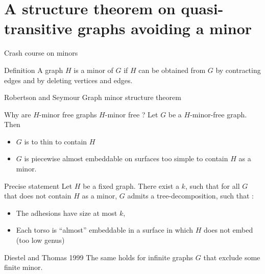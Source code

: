 \documentclass[11pt,dvipsnames,presentation,aspectratio=169]{beamer}
\begin{document}
\section*{A structure theorem on quasi-transitive graphs avoiding a minor}

\begin{frame}{Crash course on minors}
  \begin{exampleblock}{Definition}
    A graph $H$ is a minor of $G$ if $H$ can be obtained from $G$ by contracting
    edges and by deleting vertices and edges.
  \end{exampleblock}

\end{frame}

\begin{frame}{Robertson and Seymour Graph minor structure theorem}
  \begin{alertblock}{Why are $H$-minor free graphs $H$-minor free ?}
    Let $G$ be a $H$-minor-free graph. Then 
    \begin{itemize}
    \item $G$ is to thin to contain $H$
    \item $G$ is piecewise almost embeddable on surfaces too simple to contain
      $H$ as a minor.
    \end{itemize}
  \end{alertblock}

  \begin{block}{Precise statement}
    Let $H$ be a fixed graph. There exist a $k$, such that for all $G$ that does
    not contain $H$ as a minor, $G$ admits a tree-decomposition, such that :
    \begin{itemize}
    \item The adhesions have size at most $k$,
    \item Each torso is ``almost'' embeddable in a surface in which $H$ does not
      embed (too low genus)
    \end{itemize}
  \end{block}

  \begin{block}{Diestel and Thomas 1999}
    The same holds for infinite graphs $G$ that exclude some finite minor.
  \end{block}
\end{frame}
\end{document}
